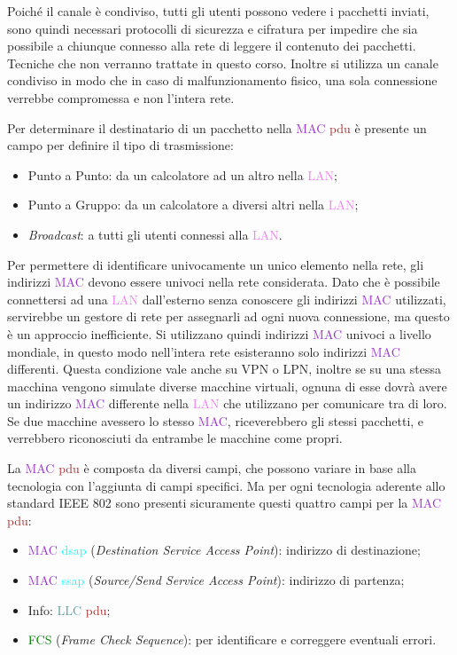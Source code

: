 \documentclass{article}
\numberwithin{equation}{subsection}
\begin{document}
Poiché il canale è condiviso, tutti gli utenti possono vedere i pacchetti inviati, sono quindi necessari protocolli di sicurezza e cifratura per impedire che sia possibile a chiunque connesso alla rete di leggere il 
contenuto dei pacchetti. Tecniche che non verranno trattate in questo corso. 
Inoltre si utilizza un canale condiviso in modo che in caso di malfunzionamento fisico, una sola connessione verrebbe compromessa e non l'intera rete. 

Per determinare il destinatario di un pacchetto nella \textcolor{DarkOrchid}{MAC} \textcolor{Brown}{pdu} è presente un campo per definire il tipo di trasmissione:
\begin{itemize}
    \item Punto a Punto: da un calcolatore ad un altro nella \textcolor{violet}{LAN};
    \item Punto a Gruppo: da un calcolatore a diversi altri nella \textcolor{violet}{LAN};
    \item \textit{Broadcast}: a tutti gli utenti connessi alla \textcolor{violet}{LAN}. 
\end{itemize}

Per permettere di identificare univocamente un unico elemento nella rete, gli indirizzi \textcolor{DarkOrchid}{MAC} devono essere univoci nella rete considerata. Dato che è possibile connettersi ad una \textcolor{violet}{LAN} dall'esterno senza conoscere gli 
indirizzi \textcolor{DarkOrchid}{MAC} utilizzati, servirebbe un gestore di rete per assegnarli ad ogni nuova connessione, ma questo è un approccio inefficiente. Si utilizzano quindi indirizzi \textcolor{DarkOrchid}{MAC} univoci a livello mondiale, in questo modo 
nell'intera rete esisteranno solo indirizzi \textcolor{DarkOrchid}{MAC} differenti. Questa condizione vale anche su VPN o LPN, inoltre se su una stessa macchina vengono simulate diverse macchine virtuali, ognuna di esse dovrà avere un 
indirizzo \textcolor{DarkOrchid}{MAC} differente nella \textcolor{violet}{LAN} che utilizzano per comunicare tra di loro. 
Se due macchine avessero lo stesso \textcolor{DarkOrchid}{MAC}, riceverebbero gli stessi pacchetti, e verrebbero riconosciuti da entrambe le macchine come propri. 



La \textcolor{DarkOrchid}{MAC} \textcolor{Brown}{pdu} è composta da diversi campi, che possono variare in base alla tecnologia con l'aggiunta di campi specifici. Ma per ogni tecnologia aderente allo standard IEEE 802 sono presenti sicuramente questi quattro 
campi per la \textcolor{DarkOrchid}{MAC} \textcolor{Brown}{pdu}:
\begin{itemize}
    \item \textcolor{DarkOrchid}{MAC} \textcolor{cyan}{dsap} (\textit{Destination Service Access Point}): indirizzo di destinazione;
    \item \textcolor{DarkOrchid}{MAC} \textcolor{cyan}{ssap} (\textit{Source/Send Service Access Point}): indirizzo di partenza;
    \item Info: \textcolor{CadetBlue}{LLC} \textcolor{Brown}{pdu};
    \item \textcolor{Green}{FCS} (\textit{Frame Check Sequence}): per identificare e correggere eventuali errori.
\end{itemize}
\end{document}
